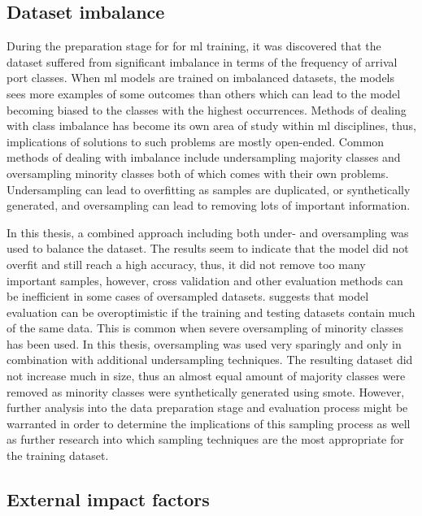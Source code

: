 \subsection{Dataset imbalance}

During the preparation stage for for \acrshort{ml} training, it was discovered that the dataset suffered from significant imbalance in terms of the frequency of arrival port classes. When \acrshort{ml} models are trained on imbalanced datasets, the models sees more examples of some outcomes than others which can lead to the model becoming biased to the classes with the highest occurrences. Methods of dealing with class imbalance has become its own area of study within \acrshort{ml} disciplines, thus, implications of solutions to such problems are mostly open-ended. Common methods of dealing with imbalance include undersampling majority classes and oversampling minority classes both of which comes with their own problems. Undersampling can lead to overfitting as samples are duplicated, or synthetically generated, and oversampling can lead to removing lots of important information.

In this thesis, a combined approach including both under- and oversampling was used to balance the dataset. The results seem to indicate that the model did not overfit and still reach a high accuracy, thus, it did not remove too many important samples, however, cross validation and other evaluation methods can be inefficient in some cases of oversampled datasets. \cite{cv_imbalance} suggests that model evaluation can be overoptimistic if the training and testing datasets contain much of the same data. This is common when severe oversampling of minority classes has been used. In this thesis, oversampling was used very sparingly and only in combination with additional undersampling techniques. The resulting dataset did not increase much in size, thus an almost equal amount of majority classes were removed as minority classes were synthetically generated using \acrfull{smote}. However, further analysis into the data preparation stage and evaluation process might be warranted in order to determine the implications of this sampling process as well as further research into which sampling techniques are the most appropriate for the training dataset.

\subsection{External impact factors}

